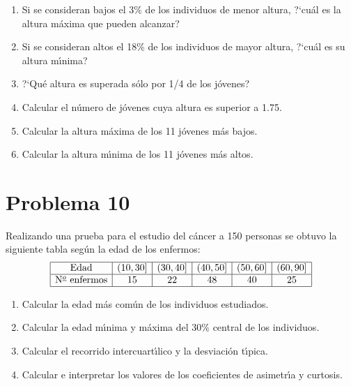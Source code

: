 \documentclass[hidequestions]{homework}
\begin{document}
	\begin{enumerate}
		\item Si se consideran bajos el 3\% de los individuos de menor  altura,
		?`cu{\'a}l es la altura m{\'a}xima que pueden alcanzar?
		\item Si se consideran altos el 18\% de los individuos de mayor  altura,
		?`cu{\'a}l es su altura m{\'\i}nima?
		\item ?`Qu{\'e} altura es superada s{\'o}lo por 1/4 de los j{\'o}venes?
		\item Calcular el n{\'u}mero de j{\'o}venes cuya altura es superior a 1.75.
		\item Calcular la altura m{\'a}xima de los 11 j{\'o}venes m{\'a}s bajos.
		\item Calcular la altura m{\'\i}nima de los 11 j{\'o}venes m{\'a}s altos. \\
	\end{enumerate}
	
	\color{black}
	
	
	
	
	\section{Problema 10}
	\color{blue}
	Realizando una prueba para el estudio del  c{\'a}ncer  a  150  personas  se
	obtuvo la siguiente tabla seg{\'u}n la edad de los enfermos:
	$$
	\begin{array}{|c|c|c|c|c|c|} \hline
	\mbox{Edad}        & (10,30] & (30,40] & (40,50] & (50,60] & (60,90] \\ \hline
	\mbox{N${}^{\underline{o}}$ enfermos} &   15  &   22  &   48  &   40  &  25   \\ \hline
	\end{array}
	$$
	\begin{enumerate}
		\item Calcular la edad m{\'a}s com{\'u}n de los individuos estudiados.
		\item Calcular la edad m{\'\i}nima y m{\'a}xima del 30\% central de los individuos.
		\item Calcular el recorrido intercuart{\'\i}lico y la desviaci{\'o}n t{\'\i}pica.
		\item Calcular e interpretar los valores de los coeficientes de asimetr{\'\i}a y curtosis. \\
	\end{enumerate}
	
	\color{black}
	
	
\end{document}
